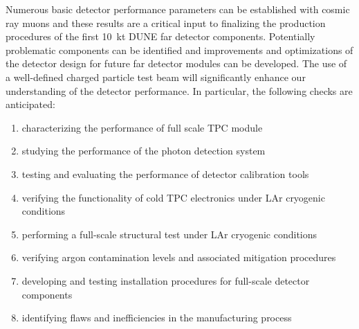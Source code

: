 Numerous basic detector performance parameters can be established with cosmic ray muons and these results are a critical input to finalizing the production procedures of the first 10~kt DUNE far detector components. Potentially problematic components can be identified and improvements and optimizations of the detector design for future far detector modules can be developed. The use of a well-defined charged particle test beam will significantly enhance our understanding of the detector performance.
%
In particular, the following checks are anticipated:
\begin{enumerate}
 \item characterizing the performance of full scale TPC module
 \item studying the performance of the photon detection system
 \item testing and evaluating the performance of detector calibration tools
  \item verifying the functionality of cold TPC electronics under LAr cryogenic conditions
  \item performing a full-scale structural test under LAr cryogenic conditions
  \item verifying argon contamination levels and associated mitigation procedures
  \item developing and testing installation procedures for full-scale detector components
  \item identifying flaws and inefficiencies in the manufacturing process
\end{enumerate}

